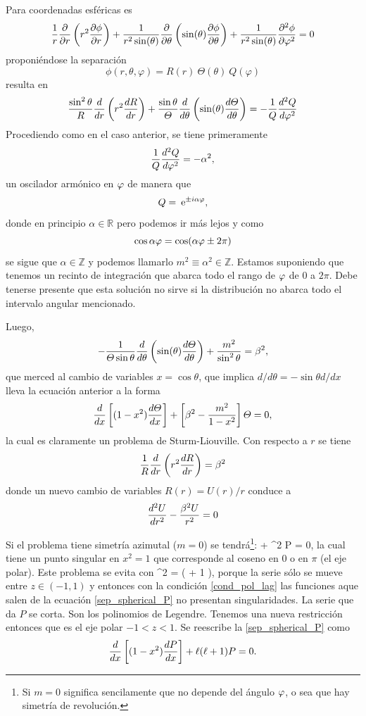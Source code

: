 \documentclass[10pt,oneside]{CBFT_book}
\begin{document}
Para coordenadas esféricas es
\[
	\frac{1}{r} \frac{\partial}{\partial r}\left( r^2 \dpar{\phi}{r} \right) + 
	\frac{1}{r^2 \sin(\theta)}\frac{\partial}{\partial\theta}\left(\sin(\theta)\dpar{\phi}{\theta}\right)+
	\frac{1}{r^2 \sin(\theta)} \dpar[2]{\phi}{\varphi} = 0
\]
proponiéndose la separación
\[
	\phi(r,\theta,\varphi) = R(r) \: \Theta(\theta) \: Q(\varphi)
\]
resulta en 
\[
	\frac{\sin^2\theta}{R} \dtot{}{r}\left( r^2 \dtot{R}{r} \right) + 
	\frac{\sin\theta}{\Theta} \dtot{}{\theta}\left( \sin(\theta)\dtot{\Theta}{\theta}\right) =
	- \frac{1}{Q} \dtot[2]{Q}{\vp} 
\]
Procediendo como en el caso anterior, se tiene primeramente
\[
	\frac{1}{Q} \dtot[2]{Q}{\vp} = - \alpha^2,
\]
un oscilador armónico en $\vp$ de manera que 
\[
	Q = \euler^{\pm i\alpha \varphi},
\]
donde en principio $\alpha \in \mathbb{R}$ pero podemos ir más lejos y como 
\[
	\cos \alpha\vp = \cos (\alpha\vp \pm 2\pi)
\]
se sigue que $\alpha \in \mathbb{Z}$ y podemos llamarlo $m^2 \equiv \alpha^2 \in \mathbb{Z}$.
Estamos suponiendo que tenemos un recinto de integración que abarca todo el rango de $\vp$
de $0$ a $2\pi$. Debe tenerse presente que esta solución no sirve si la distribución no
abarca todo el intervalo angular mencionado.

Luego,
\[
	- \frac{1}{\Theta \sin\theta } \dtot{}{\theta}\left( \sin(\theta)\dtot{\Theta}{\theta}\right) +
	\frac{m^2}{\sin^2\theta} = \beta^2,
\]
que merced al cambio de variables $x = \cos\theta$, que implica $d/d\theta = - \sin\theta d/dx$ lleva
la ecuación anterior a la forma
\[
	\dtot{}{x}\left[ (1-x^2)\dtot{\Theta}{x} \right] + \left[ \beta^2 - \frac{m^2}{1-x^2} \right] \Theta = 0,
\]
la cual es claramente un problema de Sturm-Liouville. Con respecto a $r$ se tiene
\[
	\frac{1}{R} \dtot{}{r}\left( r^2 \dtot{R}{r} \right) = \beta^2
\]
donde un nuevo cambio de variables $R(r) = U(r)/r$ conduce a
\[
	\dtot[2]{U}{r} - \frac{\beta^2 U }{r^2}= 0
\]

Si el problema tiene simetría azimutal ($m=0$) se tendrá\footnote{Si $m=0$ significa sencilamente
que no depende del ángulo $\vp$, o sea que hay simetría de revolución.}:
\be
	 + \beta^2 P = 0,
	\label{sep_spherical_P}
\ee
la cual tiene un punto singular en $x^2=1$ que corresponde al coseno en $0$ o en $\pi$ (el eje polar).
Este problema se evita con 
\be
	\beta^2 = \ell ( \ell + 1 ), \qquad \ell \in {}
	\label{cond_pol_lag}
\ee
porque la serie sólo se mueve entre $z \in (-1,1)$ y entonces con la condición \eqref{cond_pol_lag} las funciones
aque salen de la ecuación \eqref{sep_spherical_P} no presentan singularidades.
La serie que da $P$ se corta. Son los polinomios de Legendre. Tenemos una nueva restricción entonces que es el
eje polar $-1<z<1$. Se reescribe la \eqref{sep_spherical_P} como
\[
	\dtot{}{x}\left[ (1-x^2)\dtot{P}{x} \right] +  \ell ( \ell + 1 ) P = 0.
\]
\end{document}
